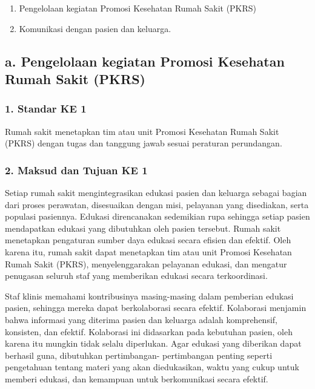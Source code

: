 \documentclass[
]{book}
\providecommand{\tightlist}{%
  \setlength{\itemsep}{0pt}\setlength{\parskip}{0pt}}
\begin{document}
\begin{enumerate}
\def\labelenumi{\alph{enumi}.}
\tightlist
\item
  Pengelolaan kegiatan Promosi Kesehatan Rumah Sakit (PKRS)
\item
  Komunikasi dengan pasien dan keluarga.
\end{enumerate}

\hypertarget{a.-pengelolaan-kegiatan-promosi-kesehatan-rumah-sakit-pkrs}{%
\subsection*{a. Pengelolaan kegiatan Promosi Kesehatan Rumah Sakit (PKRS)}\label{a.-pengelolaan-kegiatan-promosi-kesehatan-rumah-sakit-pkrs}}

\hypertarget{standar-ke-1}{%
\subsubsection*{1. Standar KE 1}\label{standar-ke-1}}

Rumah sakit menetapkan tim atau unit Promosi Kesehatan Rumah Sakit (PKRS) dengan tugas dan tanggung jawab sesuai peraturan perundangan.

\hypertarget{maksud-dan-tujuan-ke-1}{%
\subsubsection*{2. Maksud dan Tujuan KE 1}\label{maksud-dan-tujuan-ke-1}}

Setiap rumah sakit mengintegrasikan edukasi pasien dan keluarga sebagai bagian dari proses perawatan, disesuaikan dengan misi, pelayanan yang disediakan, serta populasi pasiennya. Edukasi direncanakan sedemikian rupa sehingga setiap pasien mendapatkan edukasi yang dibutuhkan oleh pasien tersebut. Rumah sakit menetapkan pengaturan sumber daya edukasi secara efisien dan efektif. Oleh karena itu, rumah sakit dapat menetapkan tim atau unit Promosi Kesehatan Rumah Sakit (PKRS), menyelenggarakan pelayanan edukasi, dan mengatur penugasan seluruh staf yang memberikan edukasi secara terkoordinasi.

Staf klinis memahami kontribusinya masing-masing dalam pemberian edukasi pasien, sehingga mereka dapat berkolaborasi secara efektif. Kolaborasi menjamin bahwa informasi yang diterima pasien dan keluarga adalah komprehensif, konsisten, dan efektif. Kolaborasi ini didasarkan pada kebutuhan pasien, oleh karena itu mungkin tidak selalu diperlukan. Agar edukasi yang diberikan dapat berhasil guna, dibutuhkan pertimbangan- pertimbangan penting seperti pengetahuan tentang materi yang akan diedukasikan, waktu yang cukup untuk memberi edukasi, dan kemampuan untuk berkomunikasi secara efektif.
\end{document}

